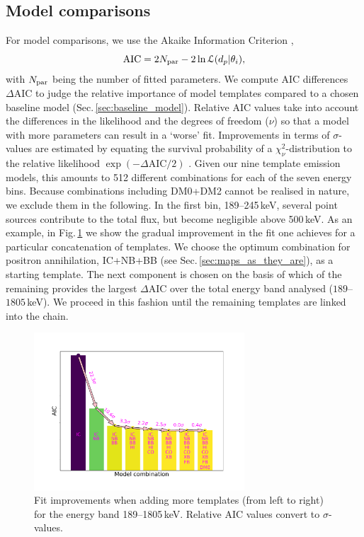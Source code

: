 \documentclass[doublespace,nopageskip]{VTthesis}
\begin{document}
\subsection{Model comparisons}\label{sec:model_comparisons}\label{sec:model_combinations}
%
For model comparisons, we use the Akaike Information Criterion \citep[AIC;][]{Akaike1974_AIC,Burnham2004_AICBIC},
%
\begin{equation}
	\mathrm{AIC} = 2 N_{\rm par} - 2 \ln\mathcal{L}(d_p|\theta_i)\mathrm{,}
	\label{eq:AICc}
\end{equation}
%
\noindent with $N_{\rm par}$ being the number of fitted parameters.
%
We compute AIC differences $\Delta\mathrm{AIC}$ to judge the relative importance of model templates compared to a chosen baseline model (Sec.\,\ref{sec:baseline_model}).
%
Relative AIC values take into account the differences in the likelihood and the degrees of freedom ($\nu$) so that a model with more parameters can result in a `worse' fit.
%
Improvements in terms of $\sigma$-values are estimated by equating the survival probability of a $\chi^2_{\nu}$-distribution to the relative likelihood $\exp\left(-\Delta\mathrm{AIC}/2\right)$ \citep{Burnham2004_AICBIC}.
%
Given our nine template emission models, this amounts to 512 different combinations for each of the seven energy bins.
%
Because combinations including DM0+DM2 cannot be realised in nature, we exclude them in the following.
%
In the first bin, 189--245\,keV, several point sources contribute to the total flux, but become negligible above 500\,keV.	
%
As an example, in Fig.\,\ref{fig:model_improvement_all_models} we show the 
gradual improvement in the fit one achieves for a particular concatenation of templates.
%
We choose the optimum combination for positron annihilation, IC+NB+BB (see Sec.\,\ref{sec:maps_as_they_are}), as a starting template.
%
The next component is chosen on the basis of which of the remaining provides the largest $\Delta\mathrm{AIC}$ over the total energy band analysed ($189$--$1805$\,keV).
%
We proceed in this fashion until the remaining templates are linked into the chain.

\begin{figure}[htb]
	\centering
	\includegraphics[width=0.7\textwidth,trim=0.10in 0.7in 0.94in 0.83in,clip=true]{Figures/511keV/bar_plot_aic_spec_new2.pdf}%
	\caption{Fit improvements when adding more templates (from left to right) for the energy band 189--1805\,keV. Relative AIC values convert to $\sigma$-values.}
	\label{fig:model_improvement_all_models}%
\end{figure}
\end{document}
